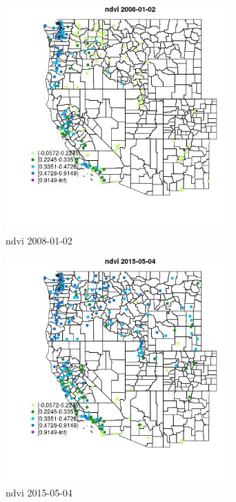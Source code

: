 \begin{figure} 
\centering  
\includegraphics[width=0.77\textwidth]{Code_Outputs/Report_ML_input_PM25_Step4_part_e_de_duplicated_aves_compiled_2019-05-18wNAs_MapObsndvi2008-01-02.jpg} 
\caption{\label{fig:Report_ML_input_PM25_Step4_part_e_de_duplicated_aves_compiled_2019-05-18wNAsMapObsndvi2008-01-02}ndvi 2008-01-02} 
\end{figure} 
 

\begin{figure} 
\centering  
\includegraphics[width=0.77\textwidth]{Code_Outputs/Report_ML_input_PM25_Step4_part_e_de_duplicated_aves_compiled_2019-05-18wNAs_MapObsndvi2015-05-04.jpg} 
\caption{\label{fig:Report_ML_input_PM25_Step4_part_e_de_duplicated_aves_compiled_2019-05-18wNAsMapObsndvi2015-05-04}ndvi 2015-05-04} 
\end{figure} 
 


